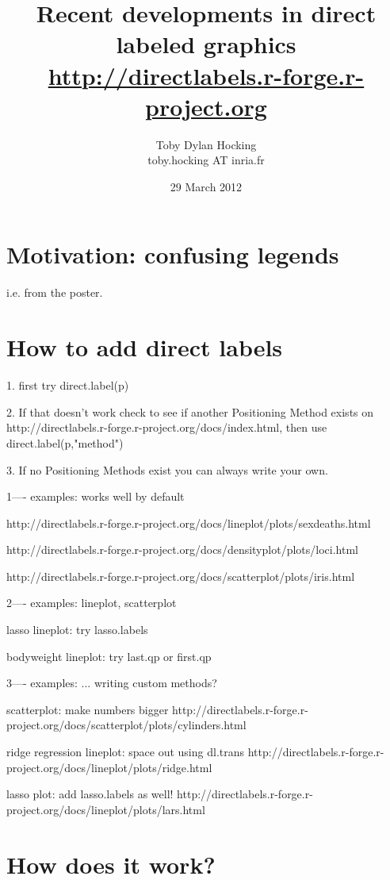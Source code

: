 \documentclass{beamer}
\begin{document}
\title{Recent developments in direct labeled graphics\\
  \url{http://directlabels.r-forge.r-project.org}}
\author{Toby Dylan Hocking \\ toby.hocking AT inria.fr}
\date{29 March 2012}

\frame{\titlepage}

\section{Motivation: confusing legends}

i.e. from the poster.

\section{How to add direct labels}

1. first try direct.label(p)

2. If that doesn't work check to see if another Positioning Method
exists on http://directlabels.r-forge.r-project.org/docs/index.html,
then use direct.label(p,"method")

3. If no Positioning Methods exist you can always write your own.

1---- examples: works well by default

http://directlabels.r-forge.r-project.org/docs/lineplot/plots/sexdeaths.html

http://directlabels.r-forge.r-project.org/docs/densityplot/plots/loci.html

http://directlabels.r-forge.r-project.org/docs/scatterplot/plots/iris.html

2---- examples: lineplot, scatterplot

lasso lineplot: try lasso.labels

bodyweight lineplot: try last.qp or first.qp

3---- examples: ... writing custom methods?

scatterplot: make numbers bigger
http://directlabels.r-forge.r-project.org/docs/scatterplot/plots/cylinders.html

ridge regression lineplot: space out using dl.trans
http://directlabels.r-forge.r-project.org/docs/lineplot/plots/ridge.html

lasso plot: add lasso.labels as well!
http://directlabels.r-forge.r-project.org/docs/lineplot/plots/lars.html

\section{How does it work?}
\end{document}
